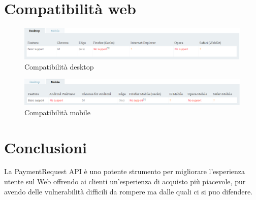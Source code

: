 \documentclass[italian]{article}
\begin{document}
	\section{Compatibilità web}
	\begin{figure}[h]
		\centering
		\includegraphics[width=1\linewidth]{Compatibilita1}
		\caption{Compatibilità desktop}
		\label{fig: Compatibilità desktop}
	\end{figure}
	\begin{figure}[h]
		\centering
		\includegraphics[width=1\linewidth]{Compatibilita2}
		\caption{Compatibilità mobile}
		\label{fig: Compatibilità mobile}
	\end{figure}

	\section{Conclusioni}
	La PaymentRequest API è uno potente strumento per migliorare l'esperienza utente sul Web offrendo ai clienti un'esperienza di acquisto più piacevole, pur avendo delle vulnerabilità difficili da rompere ma dalle quali ci si puo difendere.
\end{document}
